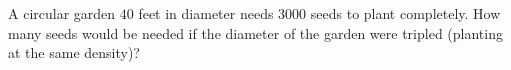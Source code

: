 A circular garden $40$ feet in diameter needs $3000$ seeds to plant completely. How many seeds would be needed if the diameter of the garden were tripled (planting at the same density)?
